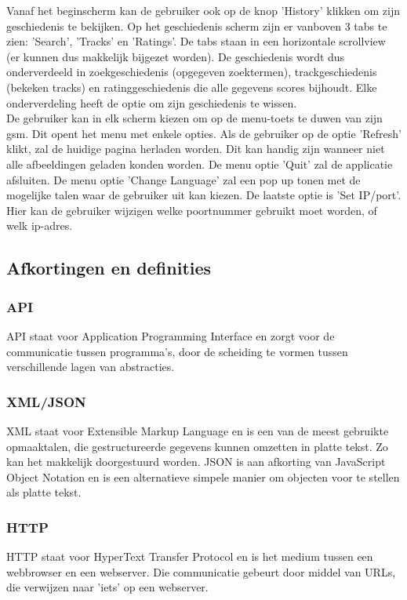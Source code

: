 \documentclass[11pt,a4paper]{article}
\begin{document}
Vanaf het beginscherm kan de gebruiker ook op de knop 'History' klikken om zijn geschiedenis te bekijken. Op het geschiedenis scherm zijn er vanboven 3 tabs te zien: 'Search', 'Tracks' en 'Ratings'.  De tabs staan in een horizontale scrollview (er kunnen dus makkelijk bijgezet worden). De geschiedenis wordt dus onderverdeeld in zoekgeschiedenis (opgegeven zoektermen), trackgeschiedenis (bekeken tracks) en ratinggeschiedenis die alle gegevens scores bijhoudt. Elke onderverdeling heeft de optie om zijn geschiedenis te wissen.
\\
De gebruiker kan in elk scherm kiezen om op de menu-toets te duwen van zijn gsm. Dit opent het menu met enkele opties. Als de gebruiker op de optie 'Refresh' klikt, zal de huidige pagina herladen worden. Dit kan handig zijn wanneer niet alle afbeeldingen geladen konden worden. De menu optie 'Quit' zal de applicatie afsluiten. De menu optie 'Change Language' zal een pop up tonen met de mogelijke talen waar de gebruiker uit kan kiezen. De laatste optie is 'Set IP/port'. Hier kan de gebruiker wijzigen welke poortnummer gebruikt moet worden, of welk ip-adres.
	
	
	\subsection{Afkortingen en definities}
	\label{sec:Afkortingen en definities}
		\subsubsection{API}
		\label{sec:API}
		API staat voor Application Programming Interface en zorgt voor de communicatie tussen programma's, door de scheiding te vormen tussen verschillende lagen van abstracties.
		\subsubsection{XML/JSON}
		\label{sec:XML/JSON}
		XML staat voor Extensible Markup Language en is een van de meest gebruikte opmaaktalen, die gestructureerde gegevens kunnen omzetten in platte tekst. Zo kan het makkelijk doorgestuurd worden.
		\newline
		JSON is aan afkorting van JavaScript Object Notation en is een alternatieve simpele manier om objecten voor te stellen als platte tekst.
		\subsubsection{HTTP}
		\label{sec:HTTP}
		HTTP staat voor HyperText Transfer Protocol en is het medium tussen een webbrowser en een webserver. Die communicatie gebeurt door middel van URLs, die verwijzen naar 'iets' op een webserver.
\end{document}
